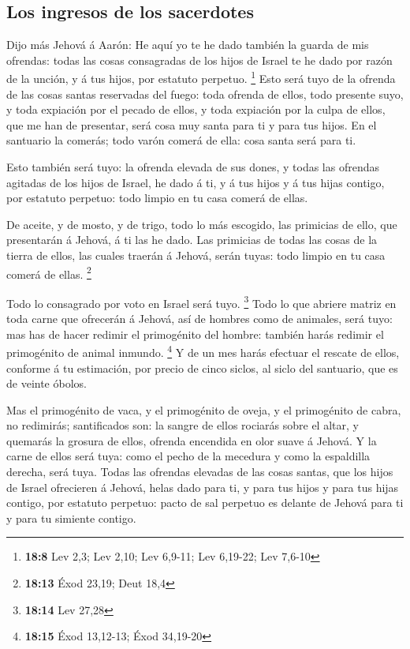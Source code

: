\hypertarget{los-ingresos-de-los-sacerdotes}{%
\subsection{Los ingresos de los
sacerdotes}\label{los-ingresos-de-los-sacerdotes}}

 Dijo más Jehová á Aarón: He aquí yo te he dado también la
guarda de mis ofrendas: todas las cosas consagradas de los hijos de
Israel te he dado por razón de la unción, y á tus hijos, por estatuto
perpetuo. \footnote{\textbf{18:8} Lev 2,3; Lev 2,10; Lev 6,9-11; Lev
  6,19-22; Lev 7,6-10}  Esto será tuyo de la ofrenda de
las cosas santas reservadas del fuego: toda ofrenda de ellos, todo
presente suyo, y toda expiación por el pecado de ellos, y toda expiación
por la culpa de ellos, que me han de presentar, será cosa muy santa para
ti y para tus hijos.  En el santuario la comerás; todo
varón comerá de ella: cosa santa será para ti.

 Esto también será tuyo: la ofrenda elevada de sus dones,
y todas las ofrendas agitadas de los hijos de Israel, he dado á ti, y á
tus hijos y á tus hijas contigo, por estatuto perpetuo: todo limpio en
tu casa comerá de ellas.

 De aceite, y de mosto, y de trigo, todo lo más escogido,
las primicias de ello, que presentarán á Jehová, á ti las he dado.
 Las primicias de todas las cosas de la tierra de ellos,
las cuales traerán á Jehová, serán tuyas: todo limpio en tu casa comerá
de ellas. \footnote{\textbf{18:13} Éxod 23,19; Deut 18,4}

 Todo lo consagrado por voto en Israel será tuyo.
\footnote{\textbf{18:14} Lev 27,28}  Todo lo que abriere
matriz en toda carne que ofrecerán á Jehová, así de hombres como de
animales, será tuyo: mas has de hacer redimir el primogénito del hombre:
también harás redimir el primogénito de animal inmundo. \footnote{\textbf{18:15}
  Éxod 13,12-13; Éxod 34,19-20}  Y de un mes harás
efectuar el rescate de ellos, conforme á tu estimación, por precio de
cinco siclos, al siclo del santuario, que es de veinte óbolos.

 Mas el primogénito de vaca, y el primogénito de oveja, y
el primogénito de cabra, no redimirás; santificados son: la sangre de
ellos rociarás sobre el altar, y quemarás la grosura de ellos, ofrenda
encendida en olor suave á Jehová.  Y la carne de ellos
será tuya: como el pecho de la mecedura y como la espaldilla derecha,
será tuya.  Todas las ofrendas elevadas de las cosas
santas, que los hijos de Israel ofrecieren á Jehová, helas dado para ti,
y para tus hijos y para tus hijas contigo, por estatuto perpetuo: pacto
de sal perpetuo es delante de Jehová para ti y para tu simiente contigo.

